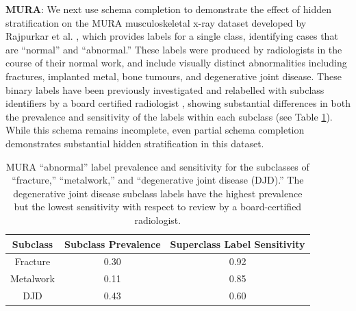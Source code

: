 \documentclass{article}
\begin{document}
\textbf{MURA}: We next use schema completion to demonstrate the effect of hidden stratification on the MURA musculoskeletal x-ray dataset developed by Rajpurkar et al. \citep{Rajpurkar2017-rc}, which provides labels for a single class, identifying cases that are ``normal'' and ``abnormal.'' 
These labels were produced by radiologists in the course of their normal work, and include visually distinct abnormalities including fractures, implanted metal, bone tumours, and degenerative joint disease. 
These binary labels have been previously investigated and relabelled with subclass identifiers by a board certified radiologist \citep{Oakden-Rayner2019-yi}, showing substantial differences in both the prevalence and sensitivity of the labels within each subclass (see Table \ref{tab:mura2}). 
While this schema remains incomplete, even partial schema completion demonstrates substantial hidden stratification in this dataset.

\begin{table}[]
\centering
\begin{tabular}{|c|c|c|}
 \hline
 Subclass & Subclass Prevalence & Superclass Label Sensitivity \\
 \hline
 Fracture & 0.30 & 0.92   \\
 Metalwork & 0.11 & 0.85    \\
 DJD & 0.43 & 0.60 \\
 \hline
\end{tabular}
\caption{MURA ``abnormal'' label prevalence and sensitivity for the subclasses of ``fracture,'' ``metalwork,'' and ``degenerative joint disease (DJD).'' The degenerative joint disease subclass labels have the highest prevalence but the lowest sensitivity with respect to review by a board-certified radiologist.}
\label{tab:mura2}
\vspace{-8mm}
\end{table}
\end{document}
